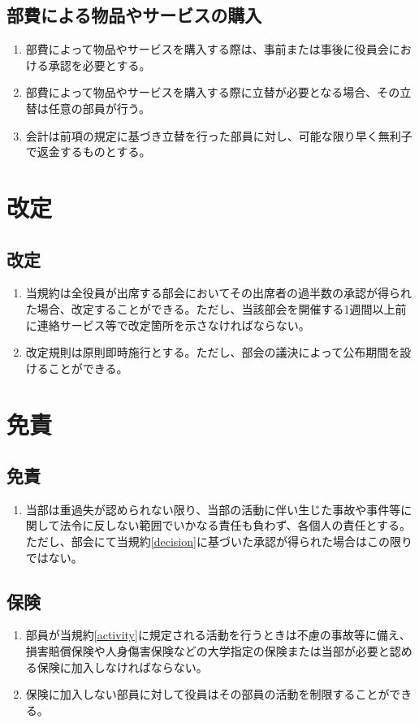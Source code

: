 \documentclass[12pt, unicode, a4paper]{ltjsreport}
\begin{document}
    \section{部費による物品やサービスの購入}
        \begin{enumerate}
            \item 部費によって物品やサービスを購入する際は、事前または事後に役員会における承認を必要とする。
            \item 部費によって物品やサービスを購入する際に立替が必要となる場合、その立替は任意の部員が行う。
            \item 会計は前項の規定に基づき立替を行った部員に対し、可能な限り早く無利子で返金するものとする。
        \end{enumerate}


\chapter{改定}
    \section{改定}
        \begin{enumerate}
            \item 当規約は全役員が出席する部会においてその出席者の過半数の承認が得られた場合、改定することができる。ただし、当該部会を開催する1週間以上前に連絡サービス等で改定箇所を示さなければならない。
            \item 改定規則は原則即時施行とする。ただし、部会の議決によって公布期間を設けることができる。
        \end{enumerate}


\chapter{免責}
    \section{免責}
        \begin{enumerate}
            \item 当部は重過失が認められない限り、当部の活動に伴い生じた事故や事件等に関して法令に反しない範囲でいかなる責任も負わず、各個人の責任とする。ただし、部会にて当規約\ref{decision}に基づいた承認が得られた場合はこの限りではない。
        \end{enumerate}
    \section{保険}
        \begin{enumerate}
            \item 部員が当規約\ref{activity}に規定される活動を行うときは不慮の事故等に備え、損害賠償保険や人身傷害保険などの大学指定の保険または当部が必要と認める保険に加入しなければならない。
            \item 保険に加入しない部員に対して役員はその部員の活動を制限することができる。
        \end{enumerate}
\end{document}
